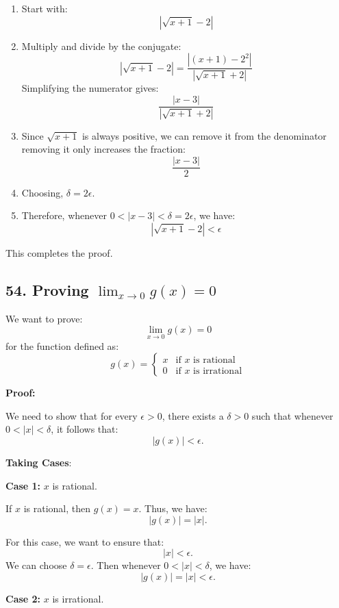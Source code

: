 \documentclass{article}
\begin{document}
\begin{enumerate}
    \item Start with:
    \[
    |\sqrt{x + 1} - 2|
    \]
    
    \item Multiply and divide by the conjugate:
    \[
    |\sqrt{x + 1} - 2| = \frac{|(x + 1) - 2^2|}{|\sqrt{x + 1} + 2|}
    \]
    Simplifying the numerator gives:
    \[
   \frac{|x - 3|}{|\sqrt{x + 1} + 2|}
    \]
    
    \item Since $\sqrt{x+1}$ is always positive, we can remove it from the denominator removing it only increases the fraction:
    \[
    \frac{|x - 3|}{2}
    \]
    
    \item Choosing, \( \delta = 2 \epsilon \).
    
    \item Therefore, whenever \( 0 < |x - 3| < \delta = 2 \epsilon \), we have:
    \[
    |\sqrt{x + 1} - 2| < \epsilon
    \]
\end{enumerate}

This completes the proof.

\subsection*{ 54. Proving \( \lim_{x \to 0} g(x) = 0 \)}

We want to prove:
\[
\lim_{x \to 0} g(x) = 0
\]
for the function defined as:
\[
g(x) = \begin{cases} 
x & \text{if } x \text{ is rational} \\ 
0 & \text{if } x \text{ is irrational} 
\end{cases}
\]

\textbf{Proof:}

We need to show that for every \( \epsilon > 0 \), there exists a \( \delta > 0 \) such that whenever \( 0 < |x| < \delta \), it follows that:
\[
|g(x)| < \epsilon.
\]

\textbf{Taking Cases}:

\textbf{Case 1:} \(x\) is rational.

If \(x\) is rational, then \(g(x) = x\). Thus, we have:
\[
|g(x)| = |x|.
\]

For this case, we want to ensure that:
\[
|x| < \epsilon.
\]
We can choose \(\delta = \epsilon\). Then whenever \(0 < |x| < \delta\), we have:
\[
|g(x)| = |x| < \epsilon.
\]

\textbf{Case 2:} \(x\) is irrational.
\end{document}
